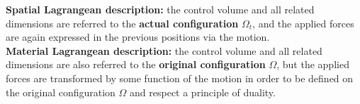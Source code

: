 \textbf{Spatial Lagrangean description:} the control volume and all related dimensions are referred to the \textbf{actual configuration} $\Omega_t$, and the applied forces are again expressed in the previous positions via the motion. \\

\textbf{Material Lagrangean description:} the control volume and all related dimensions are also referred to the \textbf{original configuration} $\Omega$, but the applied forces are transformed by some function of the motion in order to be defined on the original configuration $\Omega$ and respect a principle of duality. \\